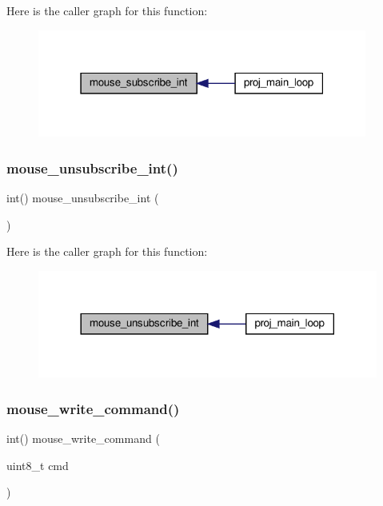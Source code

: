 Here is the caller graph for this function\+:\nopagebreak
\begin{figure}[H]
\begin{center}
\leavevmode
\includegraphics[width=307pt]{group__mouse_gaf55e4d1ccae1ac1f59dfa4222fd5de8e_icgraph}
\end{center}
\end{figure}
\mbox{\label{group__mouse_ga3ecf823d80520009ae5e0d76ae40a3c3}} 
\subsubsection{\texorpdfstring{mouse\+\_\+unsubscribe\+\_\+int()}{mouse\_unsubscribe\_int()}}
{\footnotesize\ttfamily int() mouse\+\_\+unsubscribe\+\_\+int (\begin{DoxyParamCaption}{ }\end{DoxyParamCaption})}

Here is the caller graph for this function\+:\nopagebreak
\begin{figure}[H]
\begin{center}
\leavevmode
\includegraphics[width=317pt]{group__mouse_ga3ecf823d80520009ae5e0d76ae40a3c3_icgraph}
\end{center}
\end{figure}
\mbox{\label{group__mouse_ga090c9bebd05709adc5de77ab5b26d7c3}} 
\subsubsection{\texorpdfstring{mouse\+\_\+write\+\_\+command()}{mouse\_write\_command()}}
{\footnotesize\ttfamily int() mouse\+\_\+write\+\_\+command (\begin{DoxyParamCaption}\item[{uint8\+\_\+t}]{cmd }\end{DoxyParamCaption})}

